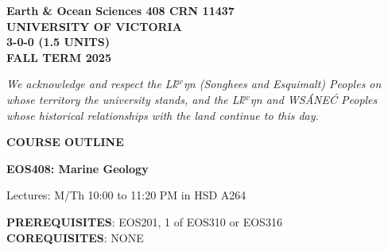 \documentclass[11pt]{article}
\def\schwa{{\tenipa\char64}}
\begin{document}


%


\hspace*{\fill}\textbf{Earth \& Ocean Sciences 408 CRN 11437}\\
\hspace*{\fill}\textbf{UNIVERSITY OF VICTORIA}\\
\hspace*{\fill}\textbf{3-0-0 (1.5 UNITS)}\\
\hspace*{\fill}\textbf{FALL TERM 2025}\\


\noindent\hrulefill

\begin{center}
	\emph{We acknowledge and respect the L\schwa\'k$^w$\schwa ŋ\schwa n (Songhees and Esquimalt) Peoples on whose territory the university stands, and the L\schwa\'k$^w$\schwa ŋ\schwa n and WS\'ANE\'C Peoples whose historical relationships with the land continue to this day.}
\end{center}

\noindent\hrulefill

\begin{center}
	\Large \textbf{COURSE OUTLINE}

	\Large \textbf{EOS408: Marine Geology}

	\normalsize Lectures: M/Th 10:00 to 11:20 PM in HSD A264 \\
\end{center}

\noindent\hrulefill

\textbf{PREREQUISITES}: EOS201, 1 of EOS310 or EOS316\\
\textbf{COREQUISITES}: NONE\\
\end{document}
